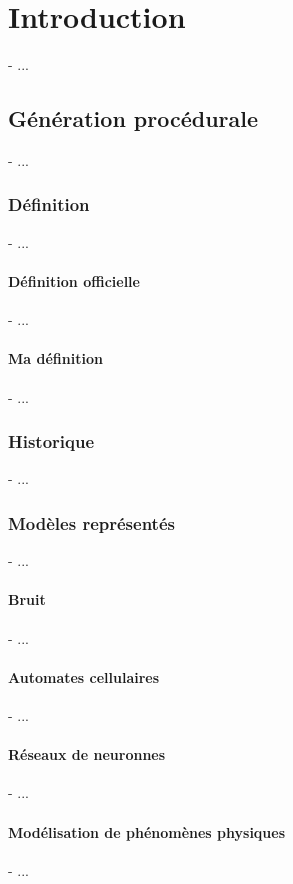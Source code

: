 \chapter{Introduction}
\label{chap:introduction}
\minitoc

- ...

\section{Génération procédurale}
\label{sec:introduction_procedural-generation}
- ...

\subsection{Définition}
- ...

\subsubsection{Définition officielle}
- ...

\subsubsection{Ma définition}
- ...

\subsection{Historique}
- ...

\subsection{Modèles représentés}
- ...

\subsubsection{Bruit}
- ...

\subsubsection{Automates cellulaires}
- ...

\subsubsection{Réseaux de neuronnes}
- ...

\subsubsection{Modélisation de phénomènes physiques}
- ...

